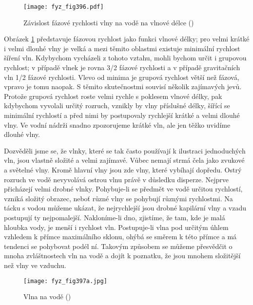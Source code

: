   \begin{figure}[ht!] %
    \centering
    \texttt{[image: fyz\_fig396.pdf]}
    \caption{Závislost fázové rychlosti vlny na vodě na vlnové délce
             (\cite[s.~697]{Feynman01})}
    \label{fyz:fig396}
  \end{figure}
  Obrázek \ref{fyz:fig396} představuje fázovou rychlost jako funkci vlnové délky; pro velmi krátké 
  i velmi dlouhé vlny je velká a mezi těmito oblastmi existuje minimální rychlost šíření vln. 
  Kdybychom vycházeli z tohoto vztahu, mohli bychom určit i grupovou rychlost; v případě vlnek je 
  rovna \num{3/2} fázové rychlosti a v případě gravitačních vln \num{1/2} fázové rychlosti. Vlevo 
  od minima je grupová rychlost větší  než fázová, vpravo je tomu naopak. S těmito skutečnostmi 
  souvisí několik zajímavých jevů. Protože grupová rychlost roste velmi rychle s poklesem vlnové 
  délky, pak kdybychom vyvolali určitý rozruch, vznikly by vlny příslušné délky, šířící se 
  minimální rychlostí a před nimi by postupovaly rychlejší krátké a velmi dlouhé vlny. Ve vodní 
  nádrži snadno zpozorujeme krátké vln, ale jen těžko uvidíme dlouhé vlny. 
  
  Dozvěděli jsme se, že vlnky, které se tak často používají k ilustraci jednoduchých vln, jsou 
  vlastně složité a velmi zajímavé. Vůbec nemají strmá čela jako zvukové a světelné vlny. Kromě 
  hlavní vlny jsou zde vlny, které vybíhají dopředu. Ostrý rozruch ve vodě nevyvolává ostrou vlnu 
  právě v důsledku disperze. Nejprve přicházejí velmi drobné vlnky. Pohybuje-li se předmět ve vodě 
  určitou rychlostí, vzniká složitý obrazec, neboť různé vlny se pohybují různými rychlostmi. Na 
  tácku s vodou můžeme ukázat, že nejrychlejší jsou drobné kapilární vlny a vzadu postupují ty 
  nejpomalejší. Nakloníme-li dno, zjistíme, že tam, kde je malá hloubka vody, je menší i rychlost 
  vln. Postupuje-li vlna pod určitým úhlem vzhledem k přímce maximálního sklonu, ohýbá se směrem k 
  této přímce a má tendenci se pohybovat podél ní. Takovým způsobem se můžeme přesvědčit o mnoha 
  zvláštnostech vln na vodě a dojít k poznatku, že jsou mnohem složitější než vlny ve vzduchu. 


  \begin{figure}[ht!] %
    \centering
    \texttt{[image: fyz\_fig397a.jpg]}
    \caption{Vlna na vodě
             (\cite[s.~697]{Feynman01})}
    \label{fyz:fig397}
  \end{figure}
  

